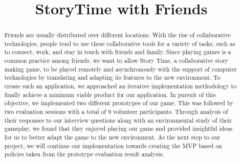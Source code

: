 \documentclass{sigchi}
\begin{document}
\title{StoryTime with Friends}

\author{%
}

\maketitle




\begin{abstract}
 Friends are usually distributed over different locations. With the rise of collaborative technologies, people tend to use these collaborative tools for a variety of tasks, such as to connect, work, and stay in touch with friends and family. Since playing games is a common practice among friends, we want to allow Story Time, a collaborative story making game, to be played remotely and asynchronously with the support of computer technologies by translating and adapting its features to the new environment. To create such an application, we approached an iterative implementation methodology to finally achieve a minimum viable product for our application. In pursuit of this objective, we implemented two different prototypes of our game. This was followed by two evaluation sessions with a total of 9 volunteer participants. Through analysis of their responses to our interview questions along with an environmental study of their gameplay, we found that they enjoyed playing our game and provided insightful ideas for us to better adapt the game to the new environment. As the next step to our project, we will continue our implementation towards creating the MVP based on policies taken from the prototype evaluation result analysis.
\end{abstract}
\end{document}
